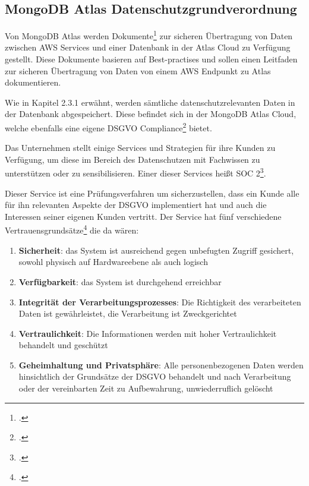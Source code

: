 \subsection{MongoDB Atlas Datenschutzgrundverordnung}
Von MongoDB Atlas werden Dokumente\footcite{atlas-doku-aws} zur sicheren Übertragung von Daten zwischen AWS Services und einer Datenbank in der Atlas Cloud zu Verfügung gestellt. Diese Dokumente basieren auf Best-practises und sollen einen Leitfaden zur
sicheren Übertragung von Daten von einem AWS Endpunkt zu Atlas dokumentieren.

Wie in Kapitel 2.3.1 erwähnt, werden sämtliche datenschutzrelevanten Daten in der Datenbank abgespeichert. Diese befindet sich in der MongoDB Atlas Cloud, welche ebenfalls eine eigene DSGVO Compliance\footcite{atlas-dsgvo-com} bietet.

Das Unternehmen stellt einige Services und Strategien für ihre Kunden zu Verfügung, um diese im Bereich des Datenschutzen mit Fachwissen zu unterstützen oder zu sensibilisieren. Einer dieser Services heißt SOC 2\footcite{atlas-soc2}.

Dieser Service ist eine Prüfungsverfahren um sicherzustellen, dass ein Kunde alle für ihn relevanten Aspekte der DSGVO implementiert hat und auch die Interessen seiner eigenen Kunden vertritt. Der Service hat fünf verschiedene
Vertrauensgrundsätze\footcite{atlas-soc2} die da wären:

\begin{enumerate}
	\item \textbf{Sicherheit}: das System ist ausreichend gegen unbefugten Zugriff gesichert, sowohl physisch auf Hardwareebene als auch logisch
	\item \textbf{Verfügbarkeit}: das System ist durchgehend erreichbar
	\item \textbf{Integrität der Verarbeitungsprozesses}: Die Richtigkeit des verarbeiteten Daten ist gewährleistet, die Verarbeitung ist Zweckgerichtet
	\item \textbf{Vertraulichkeit}: Die Informationen werden mit hoher Vertraulichkeit behandelt und geschützt
	\item \textbf{Geheimhaltung und Privatsphäre}: Alle personenbezogenen Daten werden hinsichtlich der Grundsätze der DSGVO behandelt und nach Verarbeitung oder der vereinbarten Zeit zu Aufbewahrung, unwiederruflich gelöscht
\end{enumerate}

